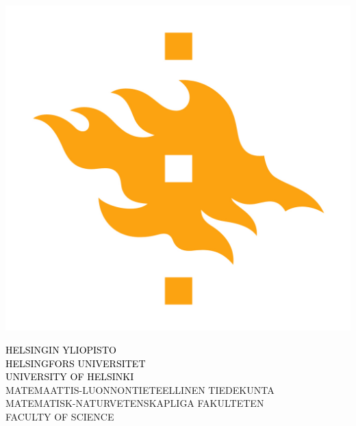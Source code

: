 \documentclass[portrait,a0]{a0poster}
\begin{document}


\begin{minipage}[t]{.4\linewidth} %
\vspace{0pt} %
\includegraphics[height=0.45\linewidth]{HYlogo_fac_text-en}
\hspace{50pt}
\end{minipage} %

\vspace{-17cm}
\begin{minipage}[t]{.98\linewidth} %
\vspace{100pt} %
\begin{flushright}
\begin{spacing}{5}
{\Huge{}\textcolor{black}{\MakeUppercase{Helsingin Yliopisto}} \MakeUppercase{}}\\
{\Huge{}\textcolor{black}{\MakeUppercase{Helsingfors Universitet}} \MakeUppercase{}}\\
{\Huge{}\textcolor{black}{\MakeUppercase{University of Helsinki}} \MakeUppercase{}}\\
{\Huge{}\textcolor{facultyColor}{\MakeUppercase{Matemaattis-Luonnontieteellinen tiedekunta}} \MakeUppercase{}}\\
{\Huge{}\textcolor{facultyColor}{\MakeUppercase{Matematisk-Naturvetenskapliga fakulteten}} \MakeUppercase{}}\\
{\Huge{}\textcolor{facultyColor}{\MakeUppercase{Faculty of Science}} \MakeUppercase{}}\\
\end{spacing}
\end{flushright}
\hspace{50pt}

\end{minipage} %
\end{document}

